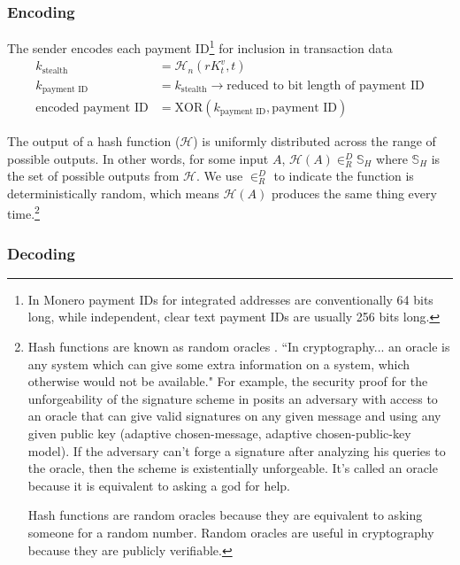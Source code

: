\subsubsection*{Encoding}

The sender encodes each payment ID\footnote{In Monero payment IDs for integrated addresses are conventionally 64 bits long, while independent, clear text payment IDs are usually 256 bits long.} for inclusion in transaction data\\
\begin{align*}
         k_{\textrm{stealth}} &= \mathcal{H}_n(r K_t^v, t) \\
      k_{\textrm{payment ID}} &= k_{\textrm{stealth}} \rightarrow \textrm{reduced to bit length of payment ID}\\
  \textrm{encoded payment ID} &= \textrm{XOR}(k_{\textrm{payment ID}}, \textrm{payment ID})
\end{align*}
    
The output of a hash function ($\mathcal{H}$) is uniformly distributed across the range of possible outputs. In other words, for some input $A$, $\mathcal{H}(A) \in^D_R \mathbb{S}_H$ where $\mathbb{S}_H$ is the set of possible outputs from $\mathcal{H}$. We use $\in^D_R$ to indicate the function is deterministically random, which means $\mathcal{H}(A)$ produces the same thing every time.\footnote{\label{oracle-note}Hash functions are known as random oracles \cite{Signatures2015BorromeanRS}. ``In cryptography... an oracle is any system which can give some extra information on a system, which otherwise would not be available."\cite{cryptographic-oracle} For example, the security proof for the unforgeability of the signature scheme in \cite{Liu2004} posits an adversary with access to an oracle that can give valid signatures on any given message and using any given public key (adaptive chosen-message, adaptive chosen-public-key model). If the adversary can't forge a signature after analyzing his queries to the oracle, then the scheme is existentially unforgeable. It's called an oracle because it is equivalent to asking a god for help.\par
Hash functions are random oracles because they are equivalent to asking someone for a random number. Random oracles are useful in cryptography because they are publicly verifiable.}

\subsubsection*{Decoding}

